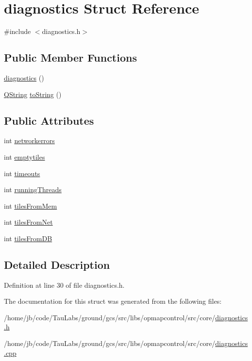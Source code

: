 \hypertarget{structdiagnostics}{\section{diagnostics \-Struct \-Reference}
\label{structdiagnostics}
}


{\ttfamily \#include $<$diagnostics.\-h$>$}

\subsection*{\-Public \-Member \-Functions}
\begin{DoxyCompactItemize}
\item 
\hyperlink{group___o_p_map_widget_ga9fb2a8142ddf0bad7dc111d9f792f456}{diagnostics} ()
\item 
\hyperlink{group___u_a_v_objects_plugin_gab9d252f49c333c94a72f97ce3105a32d}{\-Q\-String} \hyperlink{group___o_p_map_widget_gac7639db946ccc37305c9a915ab7816cc}{to\-String} ()
\end{DoxyCompactItemize}
\subsection*{\-Public \-Attributes}
\begin{DoxyCompactItemize}
\item 
int \hyperlink{group___o_p_map_widget_ga818b2b21d317fac5193b04d2c0e32c82}{networkerrors}
\item 
int \hyperlink{group___o_p_map_widget_ga34fe3ec60c45212857e46367009f0729}{emptytiles}
\item 
int \hyperlink{group___o_p_map_widget_ga9f4f4d5bc0d01d665175028f4ea970c7}{timeouts}
\item 
int \hyperlink{group___o_p_map_widget_gae7dc693c162396310de691f67b4b0e99}{running\-Threads}
\item 
int \hyperlink{group___o_p_map_widget_gade3ce38dee3744ba9c72ca0dce86b0d4}{tiles\-From\-Mem}
\item 
int \hyperlink{group___o_p_map_widget_ga6750459fc54ae81a5870b841aff67c6c}{tiles\-From\-Net}
\item 
int \hyperlink{group___o_p_map_widget_ga1a83442bf140e95b84931d57cc849449}{tiles\-From\-D\-B}
\end{DoxyCompactItemize}


\subsection{\-Detailed \-Description}


\-Definition at line 30 of file diagnostics.\-h.



\-The documentation for this struct was generated from the following files\-:\begin{DoxyCompactItemize}
\item 
/home/jb/code/\-Tau\-Labs/ground/gcs/src/libs/opmapcontrol/src/core/\hyperlink{diagnostics_8h}{diagnostics.\-h}\item 
/home/jb/code/\-Tau\-Labs/ground/gcs/src/libs/opmapcontrol/src/core/\hyperlink{diagnostics_8cpp}{diagnostics.\-cpp}\end{DoxyCompactItemize}
